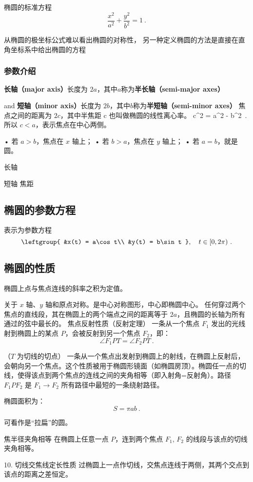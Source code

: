 \begin{definition}{椭圆的标准方程}
\begin{equation}\label{eq_Elips3_3}
\frac{x^2}{a^2} + \frac{y^2}{b^2} = 1~.
\end{equation}
\end{definition}

从椭圆的极坐标公式难以看出椭圆的对称性， 另一种定义椭圆的方法是直接在直角坐标系中给出椭圆的方程

\subsubsection{参数介绍}

\textbf{长轴（major axis）}长度为 $2a$，其中$a$称为\textbf{半长轴（semi-major axes）}

and 
\textbf{短轴（minor axis）}长度为 $2b$，其中$b$称为\textbf{半短轴（semi-minor axes）}
焦点之间的距离为 $2c$，其中半焦距 c 也叫做椭圆的线性离心率。
 c^2 = a^2 - b^2~. 
所以 $c < a$，表示焦点在中心两侧。

	•	若 $a > b$，焦点在 $x$ 轴上；
	•	若 $b > a$，焦点在 $y$ 轴上；
	•	若 $a = b$，就是圆。


长轴

短轴
焦距

\subsection{椭圆的参数方程}
表示为参数方程
\begin{equation}\label{eq_Elips3_1}
\leftgroup{
&x(t) = a\cos t\\
&y(t) = b\sin t
},\quad t \in [0, 2\pi) ~.
\end{equation}
\subsection{椭圆的性质}

椭圆上点与焦点连线的斜率之积为定值。

关于 $x$ 轴、$y$ 轴和原点对称。是中心对称图形，中心即椭圆中心。
任何穿过两个焦点的直线段，其在椭圆上的两个端点之间的距离等于 $2a$，且椭圆的长轴为所有通过的弦中最长的。
焦点反射性质（反射定理）
一条从一个焦点 $F_1$ 发出的光线射到椭圆上的某点 $P$，会被反射到另一个焦点 $F_2$，即：
\begin{equation}
\angle F_1PT = \angle F_2PT~.
\end{equation}

（$T$ 为切线的切点）
一条从一个焦点出发射到椭圆上的射线，在椭圆上反射后，会朝向另一个焦点。这个性质被用于椭圆形镜面（如椭圆房顶）。椭圆任一点的切线，使得该点到两个焦点的连线之间的夹角相等（即入射角=反射角）。路径 $F_1PF_2$ 是 $F_1 \to F_2$ 所有路径中最短的一条绕射路径。

椭圆面积为：
\begin{equation}
S = \pi a b~.
\end{equation}

可看作是“拉扁”的圆。

焦半径夹角相等
在椭圆上任意一点 $P$，连到两个焦点 $F_1$, $F_2$ 的线段与该点的切线夹角相等。

	10.	切线交焦线定长性质
过椭圆上一点作切线，交焦点连线于两侧，其两个交点到该点的距离之差恒定。







